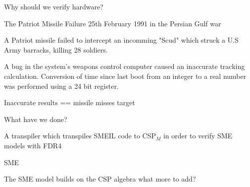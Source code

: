 \documentclass[13pt]{beamer}
\newcommand{\cspm}{CSP$_M$}
\begin{document}
\begin{frame}{Why should we verify hardware?}
  \begin{block}{The Patriot Missile Failure}
    25th February 1991 in the Persian Gulf war
  \end{block}

  \pause

  \begin{block}{}
     A Patriot missile failed to intercept an incomming "Scud" which struck a U.S Army barracks, killing 28 soldiers.
  \end{block}

  \pause

  \begin{block}{}
     A bug in the system's weapons control computer caused an inaccurate tracking calculation.
     Conversion of time since last boot from an integer to a real number was performed using a 24 bit register.
  \end{block}

  \pause

  \begin{block}{}
     Inaccurate results == missile misses target
  \end{block}

\end{frame}
%
\begin{frame}{What have we done?}
 \begin{block}{}
   A transpiler which transpiles SMEIL code to \cspm{} in order to verify SME models with FDR4
 \end{block}
\end{frame}
%
\begin{frame}{SME}
 \begin{block}{}
   The SME model builds on the CSP algebra
   what more to add?
 \end{block}
\end{frame}
%
\end{document}
